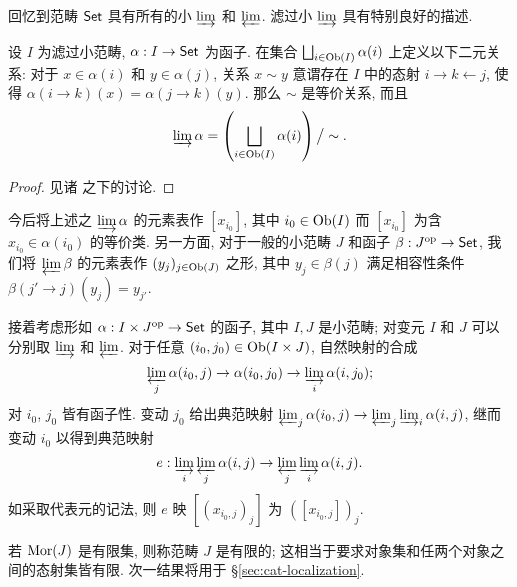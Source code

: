 回忆到范畴 $\mathsf{Set}$ 具有所有的小 $\varinjlim$ 和 $\varprojlim$. 滤过小 $\varinjlim$ 具有特别良好的描述.

\begin{proposition}\label{prop:filtered-union}
	设 $I$ 为滤过小范畴, $\alpha: I \to \mathsf{Set}$ 为函子. 在集合 $\bigsqcup_{i \in \operatorname{Ob}(I)} \alpha(i)$ 上定义以下二元关系: 对于 $x \in \alpha(i)$ 和 $y \in \alpha(j)$, 关系 $x \sim y$ 意谓存在 $I$ 中的态射 $i \rightarrow k \leftarrow j$, 使得 $\alpha(i \to k)(x) = \alpha(j \to k)(y)$. 那么 $\sim$ 是等价关系, 而且
	\[ \varinjlim \alpha = \left( \bigsqcup_{i \in \operatorname{Ob}(I)} \alpha(i) \right) \big/ \sim . \]
\end{proposition}
\begin{proof}
	见诸 \cite[定义 2.7.6]{Li1} 之下的讨论.
\end{proof}

今后将上述之 $\varinjlim \alpha$ 的元素表作 $[x_{i_0}]$, 其中 $i_0 \in \operatorname{Ob}(I)$ 而 $[x_{i_0}]$ 为含 $x_{i_0} \in \alpha(i_0)$ 的等价类. 另一方面, 对于一般的小范畴 $J$ 和函子 $\beta: J^{\operatorname{op}} \to \mathsf{Set}$, 我们将 $\varprojlim \beta$ 的元素表作 $(y_j)_{j \in \operatorname{Ob}(J)}$ 之形, 其中 $y_j \in \beta(j)$ 满足相容性条件 $\beta(j' \to j)(y_j) = y_{j'}$.

接着考虑形如 $\alpha: I \times J^{\operatorname{op}} \to \mathsf{Set}$ 的函子, 其中 $I, J$ 是小范畴; 对变元 $I$ 和 $J$ 可以分别取 $\varinjlim$ 和 $\varprojlim$. 对于任意 $(i_0, j_0) \in \operatorname{Ob}(I \times J)$, 自然映射的合成
\[ \varprojlim_j \alpha(i_0, j) \to \alpha(i_0, j_0) \to \varinjlim_i \alpha(i, j_0); \]
对 $i_0$, $j_0$ 皆有函子性. 变动 $j_0$ 给出典范映射 $\varprojlim_j \alpha(i_0, j) \to \varprojlim_j \varinjlim_i \alpha(i, j)$, 继而变动 $i_0$ 以得到典范映射
\begin{equation}\label{eqn:filtered-finite-exchange}
	e: \varinjlim_i \varprojlim_j \alpha(i, j) \to \varprojlim_j \varinjlim_i \alpha(i, j).
\end{equation}
如采取代表元的记法, 则 $e$ 映 $\left[ (x_{i_0, j})_j \right]$ 为 $\left( [ x_{i_0, j}] \right)_j$.

若 $\operatorname{Mor}(J)$ 是有限集, 则称范畴 $J$ 是有限的; 这相当于要求对象集和任两个对象之间的态射集皆有限. 次一结果将用于 \S\ref{sec:cat-localization}.


